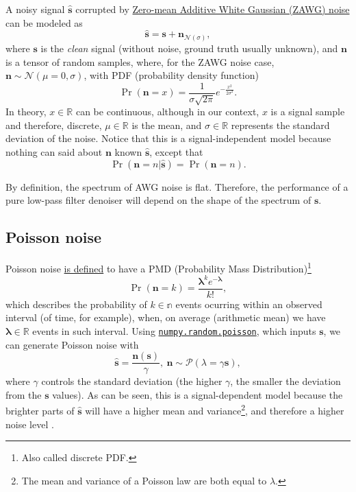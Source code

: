 \documentclass{article}
\begin{document}
A noisy signal $\hat{\mathbf s}$ corrupted by \href{https://en.wikipedia.org/wiki/Gaussian_noise}{Zero-mean Additive White Gaussian (ZAWG) noise} can be modeled as
\begin{equation}
  \hat{\mathbf s} = {\mathbf s} + {\mathbf n}_{{\mathcal N}(\sigma)},
  \label{eq:AWG_noise_model}  
\end{equation}
where $\mathbf{s}$ is the \emph{clean} signal (without noise, ground
truth usually unknown),
and ${\mathbf n}$ is a tensor of random samples,
where, for the ZAWG noise case,
${\mathbf n}\sim{\mathcal N}(\mu=0,\sigma)$, with PDF (probability density
function)
\begin{equation}
  \Pr({\mathbf n}{=}x) = \frac 1 {\sigma\sqrt{2\pi}} e^{-\frac{x^2}{2\sigma^2} }.
\end{equation}
In theory, $x\in\mathbb{R}$ can be continuous, although in our
context, $x$ is a signal sample and therefore, discrete,
$\mu\in\mathbb{R}$ is the mean, and $\sigma\in\mathbb{R}$ represents
the standard deviation of the noise. Notice that this is a
signal-independent model because nothing can said about ${\mathbf n}$
known $\hat{\mathbf s}$, except that
\begin{equation}
  \Pr(\mathbf{n}{=}n|\hat{\mathbf{s}}) = \Pr(\mathbf{n}{=}n).
\end{equation}

By definition, the spectrum of AWG noise is flat. Therefore, the
performance of a pure low-pass filter denoiser will depend on the
shape of the spectrum of $\mathbf{s}$.


\subsection{Poisson noise}

Poisson noise
\href{https://en.wikipedia.org/wiki/Poisson_distribution}{is defined}
to have a PMD (Probability Mass Distribution)\footnote{Also called
  discrete PDF.}
\begin{equation}
  \Pr({\mathbf n}{=}k) = \frac{\mathbf{\lambda}^ke^{-\mathbf{\lambda}}}{k!},
  \label{eq:PN}
\end{equation}
which describes the probability of $k\in\mathbb{n}$ events ocurring
within an observed interval (of time, for example), when, on average
(arithmetic mean) we have ${\mathbf \lambda}\in\mathbb{R}$ events in
such interval. Using
\href{https://numpy.org/doc/stable/reference/random/generated/numpy.random.poisson.html#numpy-random-poisson}{\texttt{numpy.random.poisson}},
which inputs $\mathbf{s}$, we can generate Poisson noise with
\begin{equation}
  \hat{\mathbf{s}} = \frac{\mathbf{n}(\mathbf{s})}{\gamma},~\mathbf{n}\sim\mathcal{P}(\lambda=\gamma\mathbf{s}),
\end{equation}
where $\gamma$ controls the standard deviation (the higher $\gamma$,
the smaller the deviation from the $\mathbf{s}$ values). As can be
seen, this is a signal-dependent model because the brighter parts of
$\hat{\mathbf s}$ will have a higher mean and variance\footnote{The
  mean and variance of a Poisson law are both equal to $\lambda$.},
and therefore a higher noise level \cite{meiniel2018denoising}.
\end{document}
